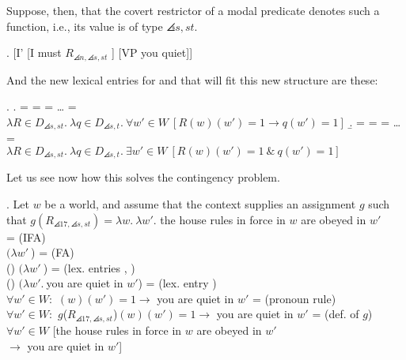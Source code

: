 Suppose, then, that the covert restrictor of a modal predicate denotes such a function, i.e., its value is of type $\angles{s,st}$.

\exi. \label{newnewlf} [I' [I must $R_{\angles{n,\angles{s,st}}}$ ] [VP you quiet]]

And the new lexical entries for  and  that will fit this new structure are these:

\ex. \a.  =  =  = \dots{} =\\
$\lambda R\in D_{\angles{s,st}}.\ \lambda q\in D_{\angles{s,t}}.\ \forall w'\in W\ [R(w)(w') =1 \rightarrow q(w')=1]$
\b.  =  =  = \dots{} =\\
$\lambda R\in D_{\angles{s,st}}.\ \lambda q\in D_{\angles{s,t}}.\ \exists w'\in W\ [R(w)(w')=1\ \&\ q(w')=1]$

Let us see now how this solves the contingency problem. 

\ex. Let $w$ be a world, and assume that the context supplies an assignment $g$ such that $g(R_{\angles{17,\angles{s,st}}}) = \lambda w.\ \lambda w'.$ the house rules in force in $w$ are obeyed in $w'$\\[9pt]
 = \hfill{\tiny (IFA)}\\
$(\lambda w'\ $) = \hfill{\tiny (FA)}\\
 () $(\lambda w'\ $) = \hfill{\tiny (lex. entries , )}\\
 () $(\lambda w'.\ $you are quiet in $w'$) = \hfill{\tiny (lex. entry )}\\
$\forall w'\in W:$ $(w)(w') =1 \rightarrow $ you are quiet in $w'$ = \hfill{\tiny (pronoun rule)}\\
$\forall w'\in W:$ $g$({$R_{\angles{17,\angles{s,st}}}$})$(w)(w') =1 \rightarrow $ you are quiet in $w'$ = \hfill{\tiny (def. of $g$)}\\
$\forall w'\in W$ [the house rules in force in $w$ are obeyed in $w'$ \\
\null\hfill $\rightarrow$ you are quiet in $w'$]

